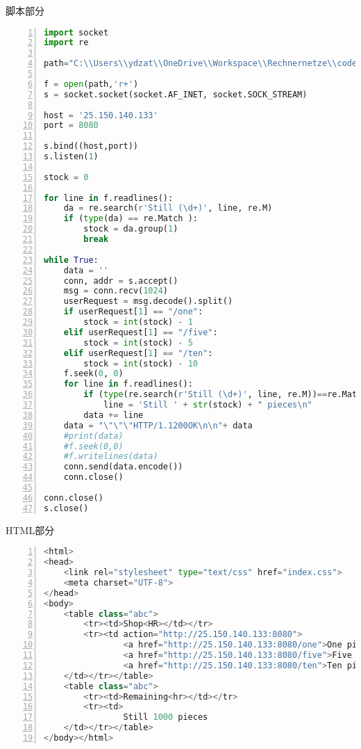 \documentclass[fleqn]{article}
\begin{document}
\noindent 脚本部分
\begin{lstlisting}[language = Python, numbers=left, 
    numberstyle=\tiny,keywordstyle=\color{blue!70},
    commentstyle=\color{red!50!green!50!blue!50},frame=shadowbox,
    rulesepcolor=\color{red!20!green!20!blue!20},basicstyle=\ttfamily]
import socket
import re

path="C:\\Users\\ydzat\\OneDrive\\Workspace\\Rechnernetze\\code\\ans2014\\new\\index.html"

f = open(path,'r+')
s = socket.socket(socket.AF_INET, socket.SOCK_STREAM)

host = '25.150.140.133'
port = 8080

s.bind((host,port))
s.listen(1)

stock = 0

for line in f.readlines():
    da = re.search(r'Still (\d+)', line, re.M)
    if (type(da) == re.Match ):
        stock = da.group(1)
        break
    
while True:
    data = ''
    conn, addr = s.accept()
    msg = conn.recv(1024)
    userRequest = msg.decode().split()
    if userRequest[1] == "/one":
        stock = int(stock) - 1
    elif userRequest[1] == "/five":
        stock = int(stock) - 5
    elif userRequest[1] == "/ten":
        stock = int(stock) - 10
    f.seek(0, 0)
    for line in f.readlines():
        if (type(re.search(r'Still (\d+)', line, re.M))==re.Match):
            line = 'Still ' + str(stock) + " pieces\n" 
        data += line
    data = "\"\"\"HTTP/1.1200OK\n\n"+ data
    #print(data)
    #f.seek(0,0)
    #f.writelines(data)
    conn.send(data.encode())
    conn.close()
    
conn.close()
s.close()
\end{lstlisting}

\noindent HTML部分

\begin{lstlisting}[language = Python, numbers=left, 
    numberstyle=\tiny,keywordstyle=\color{blue!70},
    commentstyle=\color{red!50!green!50!blue!50},frame=shadowbox,
    rulesepcolor=\color{red!20!green!20!blue!20},basicstyle=\ttfamily]
<html>
<head>
    <link rel="stylesheet" type="text/css" href="index.css">
    <meta charset="UTF-8">
</head>
<body>
    <table class="abc">
        <tr><td>Shop<HR></td></tr>
        <tr><td action="http://25.150.140.133:8080">
                <a href="http://25.150.140.133:8080/one">One piece</a><br/>
                <a href="http://25.150.140.133:8080/five">Five piece</a><br/>
                <a href="http://25.150.140.133:8080/ten">Ten piece</a>
    </td></tr></table>
    <table class="abc">
        <tr><td>Remaining<hr></td></tr>
        <tr><td>
                Still 1000 pieces
    </td></tr></table>
</body></html>
\end{lstlisting}
\end{document}
